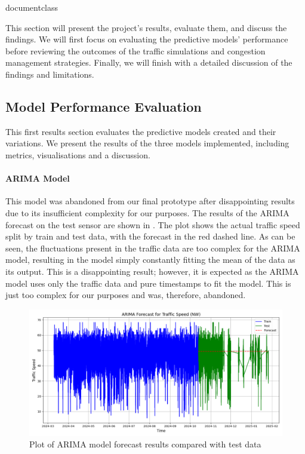 \csname documentclass
\graphicspath{{\subfix{../images/}}}


This section will present the project’s results, evaluate them, and discuss the findings. We will first focus on evaluating the predictive models’ performance before reviewing the outcomes of the traffic simulations and congestion management strategies. Finally, we will finish with a detailed discussion of the findings and limitations.

\subsection{Model Performance Evaluation}
This first results section evaluates the predictive models created and their variations. We present the results of the three models implemented, including metrics, visualisations and a discussion.

\paragraph{ARIMA Model}
\label{link:arima-results}
This model was abandoned from our final prototype after disappointing results due to its insufficient complexity for our purposes. The results of the ARIMA forecast on the test sensor are shown in . The plot shows the actual traffic speed split by train and test data, with the forecast in the red dashed line. As can be seen, the fluctuations present in the traffic data are too complex for the ARIMA model, resulting in the model simply constantly fitting the mean of the data as its output. This is a disappointing result; however, it is expected as the ARIMA model uses only the traffic data and pure timestamps to fit the model. This is just too complex for our purposes and was, therefore, abandoned.

\begin{figure}[!ht]
  \centering
  \includegraphics[width=\textwidth]{images/results-discussions/arima.pdf}
  \caption{Plot of ARIMA model forecast results compared with test data}
  \label{fig:arima-result}
\end{figure}

